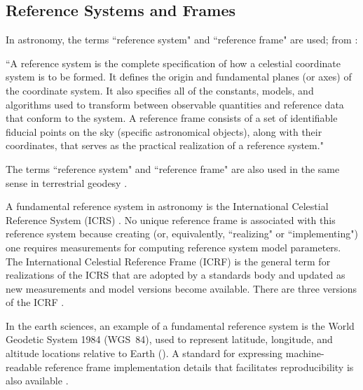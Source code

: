 \documentclass[draft]{agujournal2019}
\begin{document}

\subsection{Reference Systems and Frames}
\label{sect:refsystems}


In astronomy, the terms ``reference system" and ``reference frame" are used; from :

``A reference system is the complete specification of how a celestial coordinate system is to be formed. It defines the origin and fundamental planes (or axes) of the coordinate system. It also specifies all of the constants, models, and algorithms used to transform between observable quantities and reference data that conform to the system. A reference frame consists of a set of identifiable fiducial points on the sky (specific astronomical objects), along with their coordinates, that serves as the practical realization of a reference system."

The terms ``reference system" and ``reference frame" are also used in the same sense in terrestrial geodesy \cite{Seitz2014}.

A fundamental reference system in astronomy is the International Celestial Reference System (ICRS) \cite{Petit2010}. No unique reference frame is associated with this reference system because creating (or, equivalently, ``realizing" or ``implementing") one requires measurements for computing reference system model parameters. The International Celestial Reference Frame (ICRF) is the general term for realizations of the ICRS that are adopted by a standards body and updated as new measurements and model versions become available. There are three versions of the ICRF \cite{Charlot2020}. 

In the earth sciences, an example of a fundamental reference system is the World Geodetic System 1984 (WGS~84), used to represent latitude, longitude, and altitude locations relative to Earth (). A standard for expressing machine-readable reference frame implementation details that facilitates reproducibility is also available \cite{OGC2023}.
\end{document}
